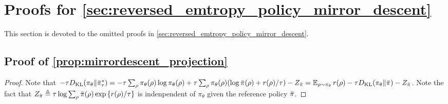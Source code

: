 \section{Proofs for \cref{sec:reversed_emtropy_policy_mirror_descent}}
This section is devoted to the omitted proofs in \cref{sec:reversed_emtropy_policy_mirror_descent}.
\subsection{Proof of \cref{prop:mirrordescent_projection}}
\begin{proof}
	Note that $-\tau D_{\mathrm{KL}}(\pi_\theta \| \bar{\pi}_\tau^*) = - \tau \sum_{\rho}{ \pi_\theta(\rho) \log \pi_\theta(\rho) } + \tau \sum_{\rho}{ \pi_\theta(\rho) (\log \bar{\pi}(\rho) + r(\rho) / \tau ) }  - Z_{\bar{\pi}} = \operatorname*{\mathbb{E}}_{\rho \sim \pi_\theta}{  r(\rho)  - \tau D_{\mathrm{KL}}(\pi_\theta \| \bar{\pi}) } - Z_{\bar{\pi}}$. Note the fact that $Z_{\bar{\pi}} \triangleq \tau \log{ \sum_{\rho}{\bar{\pi}(\rho) \exp\left\{ r(\rho) / \tau \right\} } }$ is indenpendent of $\pi_\theta$ given the reference policy $\bar{\pi}$.
\end{proof}

